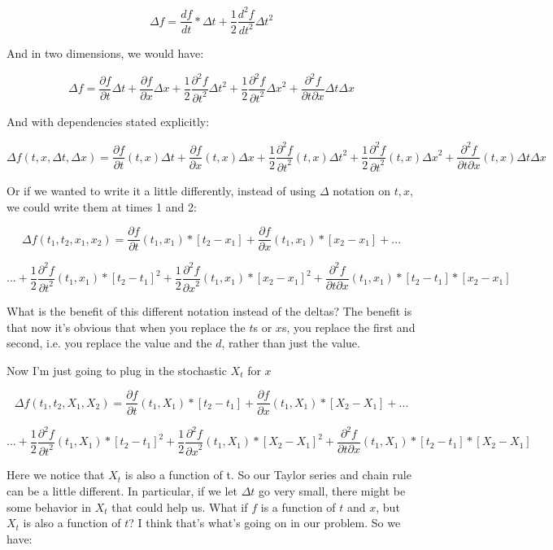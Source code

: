 \documentclass{article}
\begin{document}
$$\Delta f = \frac{df}{dt} * \Delta t + \frac{1}{2} \frac{d^2f}{dt^2} \Delta t ^2$$

And in two dimensions, we would have: 

$$\Delta f = \frac{\partial f}{\partial t} \Delta t + \frac{\partial f}{\partial x} \Delta x + \frac{1}{2}\frac{\partial^2 f}{{\partial t}^2} {\Delta t}^2 + \frac{1}{2}\frac{\partial^2 f}{{\partial t}^2} {\Delta x}^2 +  \frac{\partial^2 f}{\partial t \partial x} \Delta t\Delta x$$

And with dependencies stated explicitly:

$$\Delta f(t,x,\Delta t,\Delta x) = \frac{\partial f}{\partial t}(t,x) \Delta t + \frac{\partial f}{\partial x}(t,x) \Delta x  + \frac{1}{2}\frac{\partial^2 f}{{\partial t}^2}(t,x) {\Delta t}^2 + \frac{1}{2}\frac{\partial^2 f}{{\partial t}^2}(t,x) {\Delta x}^2 +  \frac{\partial^2 f}{\partial t \partial x}(t,x) \Delta t\Delta x$$

Or if we wanted to write it a little differently, instead of using $\Delta$ notation on $t, x$, we could write them at times 1 and 2:

$$\Delta f(t_1,t_2,x_1,x_2) = \frac{\partial f}{\partial t}(t_1,x_1) *[t_2-x_1] + \frac{\partial f}{\partial x}(t_1,x_1) *[x_2-x_1]  + ... $$

$$... +  \frac{1}{2}\frac{\partial^2 f}{{\partial t}^2}(t_1,x_1) * {[t_2-t_1]}^2 + \frac{1}{2}\frac{\partial^2 f}{{\partial x}^2}(t_1,x_1) * {[x_2-x_1]}^2 +  \frac{\partial^2 f}{\partial t \partial x}(t_1,x_1) *[t_2-t_1]*[x_2-x_1]$$

What is the benefit of this different notation instead of the deltas? The benefit is that now it's obvious that when you replace the $t$s or $x$s, you replace the first and second, i.e. you replace the value and the $d$, rather than just the value. 

Now I'm just going to plug in the stochastic $X_t$ for $x$

$$\Delta f(t_1,t_2,X_1,X_2) = \frac{\partial f}{\partial t}(t_1,X_1) *[t_2-t_1] + \frac{\partial f}{\partial x}(t_1,X_1) *[X_2-X_1]  + ... $$

$$... +  \frac{1}{2}\frac{\partial^2 f}{{\partial t}^2}(t_1,X_1) * {[t_2-t_1]}^2 + \frac{1}{2}\frac{\partial^2 f}{{\partial x}^2}(t_1,X_1) * {[X_2-X_1]}^2 +  \frac{\partial^2 f}{\partial t \partial x}(t_1,X_1) *[t_2-t_1]*[X_2-X_1]$$

Here we notice that $X_t$ is also a function of t. So our Taylor series and chain rule can be a little different.  In particular, if we let $\Delta t$ go very small, there might be some behavior in $X_t$ that could help us. What if $f$ is a function of $t$ and $x$, but $X_t$ is also a function of $t$? I think that's what's going on in our problem.  So we have:
\end{document}
